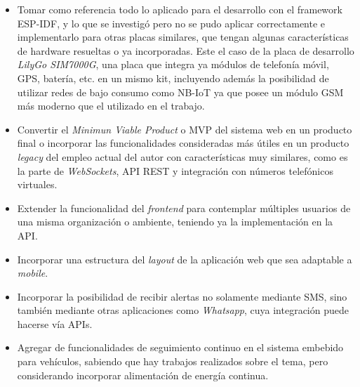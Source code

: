 \begin{itemize}
	\item Tomar como referencia todo lo aplicado para el desarrollo con el framework ESP-IDF, y lo que se investigó pero no se pudo aplicar correctamente e implementarlo para otras placas similares, que tengan algunas características de hardware resueltas o ya incorporadas. Este el caso de la placa de desarrollo \textit{LilyGo SIM7000G}, una placa que integra ya módulos de telefonía móvil, GPS, batería, etc. en un mismo kit\citep{7600G:1}, incluyendo además la posibilidad de utilizar redes de bajo consumo como NB-IoT\citep{NBIOT:1} ya que posee un módulo GSM más moderno que el utilizado en el trabajo.
	\item Convertir el \textit{Minimun Viable Product} o MVP del sistema web en un producto final o incorporar las funcionalidades consideradas más útiles en un producto \textit{legacy} del empleo actual del autor con características muy similares, como es la parte de \textit{WebSockets}, API REST y integración con números telefónicos virtuales.
	\item Extender la funcionalidad del \textit{frontend} para contemplar múltiples usuarios de una misma organización o ambiente, teniendo ya la implementación en la API.
	\item Incorporar una estructura del \textit{layout} de la aplicación web que sea adaptable a \textit{mobile}.
	\item Incorporar la posibilidad de recibir alertas no solamente mediante SMS, sino también mediante otras aplicaciones como \textit{Whatsapp}, cuya integración puede hacerse vía APIs\citep{TWILIO:3}.
	\item Agregar de funcionalidades de seguimiento continuo en el sistema embebido para vehículos, sabiendo que hay trabajos realizados sobre el tema, pero considerando incorporar alimentación de energía continua.
\end{itemize}
